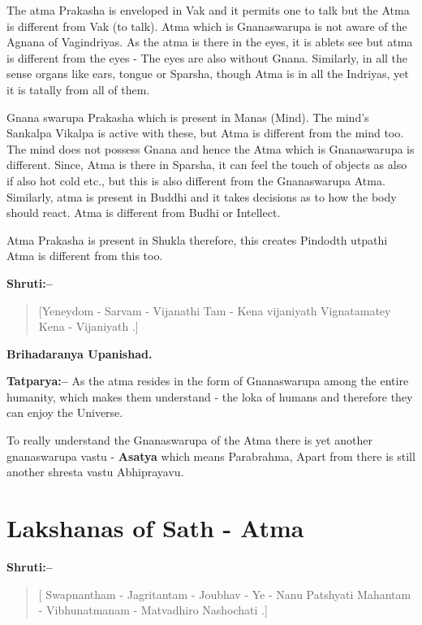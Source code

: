 The atma Prakasha is enveloped in Vak and it permits one to talk but the Atma is different from Vak (to talk). Atma which is Gnanaswarupa is not aware of the Agnana of Vagindriyas. As the atma is there in the eyes, it is ablets see but atma is different from the eyes - The eyes are also without Gnana. Similarly, in all the sense organs like ears, tongue or Sparsha, though Atma is in all the Indriyas, yet it is tatally from all of them.

Gnana swarupa Prakasha which is present in Manas (Mind). The mind's Sankalpa Vikalpa is active with these, but Atma is different from the mind too. The mind does not possess Gnana and hence the Atma which is Gnanaswarupa is different. Since, Atma is there in Sparsha, it can feel the touch of objects as also if also hot cold etc., but this is also different from the Gnanaswarupa Atma. Similarly, atma is present in Buddhi and it takes decisions as to how the body should react. Atma is different from Budhi or Intellect.

Atma Prakasha is present in Shukla therefore, this creates Pindodth utpathi Atma is different from this too.

\textbf{Shruti:–}

\begin{verse}
[Yeneydom - Sarvam - Vijanathi Tam - Kena vijaniyath  Vignatamatey Kena - Vijaniyath .]
\end{verse}

\begin{flushright}
\textbf{Brihadaranya Upanishad.}
\end{flushright}

\textbf{Tatparya:–} As the atma resides in the form of Gnanaswarupa among the entire humanity, which makes them understand - the loka of humans and therefore they can enjoy the Universe.

To really understand the Gnanaswarupa of the Atma there is yet another gnanaswarupa vastu - \textbf{Asatya} which means Parabrahma, Apart from there is still another shresta vastu Abhiprayavu.

\chapter{Lakshanas of Sath - Atma}

\textbf{Shruti:–}

\begin{verse}
[ Swapnantham - Jagritantam - Joubhav - Ye - Nanu Patshyati  Mahantam - Vibhunatmanam - Matvadhiro Nashochati .]
\end{verse}

